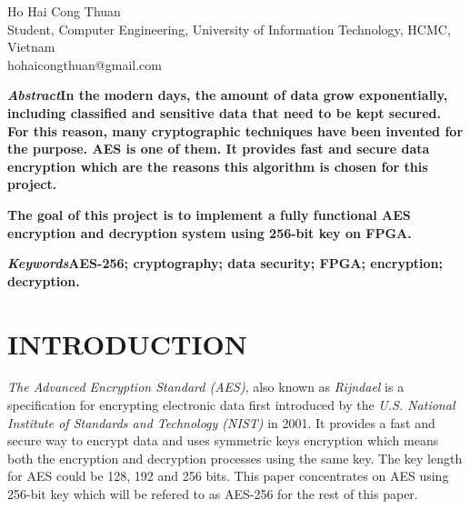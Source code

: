 \documentclass[a4paper, 10pt]{article}
\begin{document}
    \title{}
    \author{}
    \maketitle %

    \begin{center}
        Ho Hai Cong Thuan\\
        Student, Computer Engineering, University of Information Technology, HCMC, Vietnam\\
        hohaicongthuan@gmail.com
    \end{center}
    \begin{multicols}{2}
        
        \textbf{\textit{Abstract\textemdash}In the modern days, the amount of data grow exponentially, including classified and sensitive data that need to be kept secured. For this reason, many cryptographic techniques have been invented for the purpose. AES is one of them. It provides fast and secure data encryption which are the reasons this algorithm is chosen for this project.}

        \textbf{The goal of this project is to implement a fully functional AES encryption and decryption system using 256-bit key on FPGA.}
        
        \bigskip

        \textbf{\textit{Keywords\textemdash}AES-256; cryptography; data security; FPGA; encryption; decryption.}

        \section{INTRODUCTION}
            \textit{The Advanced Encryption Standard (AES)}, also known as \textit{Rijndael} is a specification for encrypting electronic data first introduced by the \textit{U.S. National Institute of Standards and Technology (NIST)} in 2001. It provides a fast and secure way to encrypt data and uses symmetric keys encryption which means both the encryption and decryption processes using the same key. The key length for AES could be 128, 192 and 256 bits. This paper concentrates on AES using 256-bit key which will be refered to as AES-256 for the rest of this paper.
            

\end{multicols}
\end{document}
